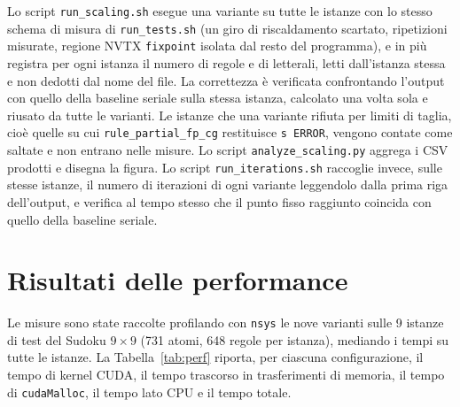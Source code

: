 \documentclass[11pt,a4paper]{article}
\begin{document}
Lo script \texttt{run\_scaling.sh} esegue una variante su tutte le istanze con lo stesso schema di
misura di \texttt{run\_tests.sh} (un giro di riscaldamento scartato, ripetizioni misurate, regione
NVTX \texttt{fixpoint} isolata dal resto del programma), e in più registra per ogni istanza il
numero di regole e di letterali, letti dall'istanza stessa e non dedotti dal nome del file. La
correttezza è verificata confrontando l'output con quello della baseline seriale sulla stessa
istanza, calcolato una volta sola e riusato da tutte le varianti. Le istanze che una variante
rifiuta per limiti di taglia, cioè quelle su cui \texttt{rule\_partial\_fp\_cg} restituisce
\texttt{s ERROR}, vengono contate come saltate e non entrano nelle misure. Lo script
\texttt{analyze\_scaling.py} aggrega i CSV prodotti e disegna la figura. Lo script
\texttt{run\_iterations.sh} raccoglie invece, sulle stesse istanze, il numero di iterazioni di ogni
variante leggendolo dalla prima riga dell'output, e verifica al tempo stesso che il punto fisso
raggiunto coincida con quello della baseline seriale.

\section{Risultati delle performance}
\label{sec:risultati}

Le misure sono state raccolte profilando con \texttt{nsys} le nove varianti sulle 9 istanze di test
del Sudoku $9\times9$ (731 atomi, 648 regole per istanza), mediando i tempi su tutte le istanze. La
Tabella~\ref{tab:perf} riporta, per ciascuna configurazione, il tempo di kernel CUDA, il tempo
trascorso in trasferimenti di memoria, il tempo di \texttt{cudaMalloc}, il tempo lato CPU e il
tempo totale.
\end{document}
